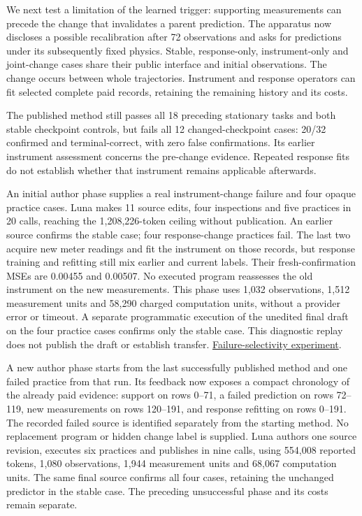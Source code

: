 \documentclass[twoside,11pt]{article}
\begin{document}
We next test a limitation of the learned trigger: supporting measurements can
precede the change that invalidates a parent prediction. The apparatus now
discloses a possible recalibration after 72 observations and asks for predictions
under its subsequently fixed physics. Stable, response-only, instrument-only and
joint-change cases share their public interface and initial observations. The
change occurs between whole trajectories. Instrument and response operators can
fit selected complete paid records, retaining the remaining history and its costs.


The published method still passes all 18 preceding stationary tasks and both
stable checkpoint controls, but fails all 12 changed-checkpoint cases: 20/32
confirmed and terminal-correct, with zero false confirmations. Its earlier
instrument assessment concerns the pre-change evidence. Repeated response fits
do not establish whether that instrument remains applicable afterwards.


An initial author phase supplies a real instrument-change failure and four opaque
practice cases. Luna makes 11 source edits, four inspections and five practices
in 20 calls, reaching the 1,208,226-token ceiling without publication. An earlier
source confirms the stable case; four response-change practices fail. The last
two acquire new meter readings and fit the instrument on those records, but
response training and refitting still mix earlier and current labels. Their
fresh-confirmation MSEs are 0.00455 and 0.00507. No executed program reassesses
the old instrument on the new measurements. This phase uses 1,032 observations,
1,512 measurement units and 58,290 charged computation units, without a provider
error or timeout. A separate programmatic execution of the unedited final draft
on the four practice cases confirms only the stable case. This diagnostic replay
does not publish the draft or establish transfer.
\hyperlink{artifact-71}{Failure-selectivity experiment}.


A new author phase starts from the last successfully published method and one
failed practice from that run. Its feedback now exposes a compact chronology of
the already paid evidence: support on rows 0–71, a failed prediction on rows
72–119, new measurements on rows 120–191, and response refitting on rows 0–191.
The recorded failed source is identified separately from the starting method.
No replacement program or hidden change label is supplied. Luna authors one
source revision, executes six practices and publishes in nine calls, using
554,008 reported tokens, 1,080 observations, 1,944 measurement units and 68,067
computation units. The same final source confirms all four cases, retaining the
unchanged predictor in the stable case. The preceding unsuccessful phase and
its costs remain separate.
\end{document}
